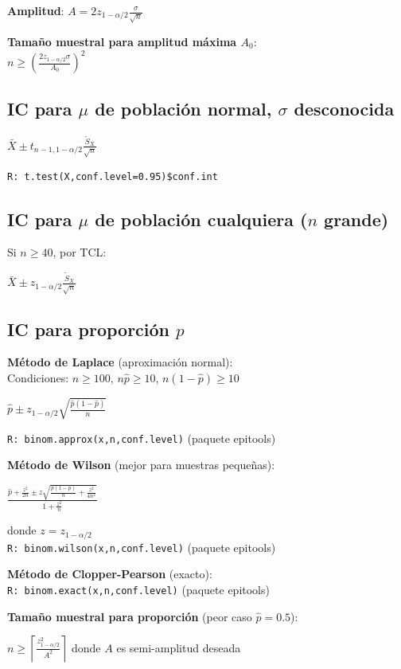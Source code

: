 \documentclass[9pt,a4paper]{article}
\newcommand{\R}{\texttt{R: }}
\begin{document}
\begin{multicols}{2}
\textbf{Amplitud}: $A=2z_{1-\alpha/2}\frac{\sigma}{\sqrt{n}}$

\textbf{Tamaño muestral para amplitud máxima $A_0$}:\\
$n\geq\left(\frac{2z_{1-\alpha/2}\sigma}{A_0}\right)^2$

\subsection{IC para $\mu$ de población normal, $\sigma$ desconocida}
\begin{formulabox}
$\bar{X}\pm t_{n-1,1-\alpha/2}\frac{\tilde{S}_X}{\sqrt{n}}$
\end{formulabox}

\R\texttt{t.test(X,conf.level=0.95)\$conf.int}

\subsection{IC para $\mu$ de población cualquiera ($n$ grande)}
Si $n\geq 40$, por TCL:
\begin{formulabox}
$\bar{X}\pm z_{1-\alpha/2}\frac{\tilde{S}_X}{\sqrt{n}}$
\end{formulabox}

\subsection{IC para proporción $p$}

\textbf{Método de Laplace} (aproximación normal):\\
Condiciones: $n\geq 100$, $n\hat{p}\geq 10$, $n(1-\hat{p})\geq 10$
\begin{formulabox}
$\hat{p}\pm z_{1-\alpha/2}\sqrt{\frac{\hat{p}(1-\hat{p})}{n}}$
\end{formulabox}
\R\texttt{binom.approx(x,n,conf.level)} (paquete epitools)

\textbf{Método de Wilson} (mejor para muestras pequeñas):
\begin{formulabox}
$\frac{\hat{p}+\frac{z^2}{2n}\pm z\sqrt{\frac{\hat{p}(1-\hat{p})}{n}+\frac{z^2}{4n^2}}}{1+\frac{z^2}{n}}$
\end{formulabox}
donde $z=z_{1-\alpha/2}$\\
\R\texttt{binom.wilson(x,n,conf.level)} (paquete epitools)

\textbf{Método de Clopper-Pearson} (exacto):\\
\R\texttt{binom.exact(x,n,conf.level)} (paquete epitools)

\textbf{Tamaño muestral para proporción} (peor caso $\hat{p}=0.5$):
\begin{formulabox}
$n\geq\left\lceil\frac{z_{1-\alpha/2}^2}{A^2}\right\rceil$ donde $A$ es semi-amplitud deseada
\end{formulabox}


\end{multicols}
\end{document}
